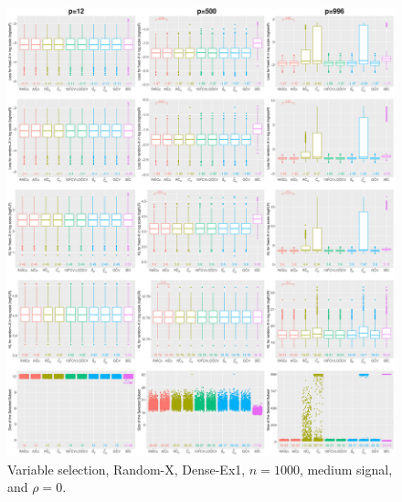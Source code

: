 \begin{figure}[!ht]
\centering
\includegraphics[width=\textwidth]{figures/supplement/randomx/subset_selection/Dense-Ex1_n1000_msnr_rho0.eps}
\caption{Variable selection, Random-X, Dense-Ex1, $n=1000$, medium signal, and $\rho=0$.}
\end{figure}
\clearpage

